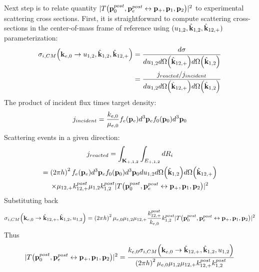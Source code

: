 \documentclass{article}[draft]
\begin{document}
Next step is to relate quantity $| T\of{\vect{p}_0^{post}, \vect{p}_e^{post} \leftrightarrow \vect{p}_+, \vect{p}_1, \vect{p}_2} |^2$ to experimental scattering cross sections. First, it is straightforward to compute scattering cross-sections in the center-of-mass frame of reference using $(u_{1,2}, \hat{\mathbf{k}}_{1,2}, \hat{\mathbf{k}}_{12,+})$ parameterization:
\begin{align*}
\sigma_{i,CM} \of{ \vect{k}_{e,0} \rightarrow u_{1,2}, \hat{\vect{k}}_{1,2}, \hat{\vect{k}}_{12,+}} 
&= \frac{d\sigma}{d u_{1,2} d\Omega\of{\hat{\vect{k}}_{12,+}} d\Omega\of{\hat{\vect{k}}_{1,2}}}
\\
&= \frac{j_{reacted}/j_{incident}}{d u_{1,2} d\Omega\of{\hat{\vect{k}}_{12,+}} d\Omega\of{\hat{\vect{k}}_{1,2}}}
\end{align*}
The product of incident flux times target density:
\begin{align*}
j_{incident} = \frac{k_{e,0}}{\mu_{e,0}} f_e\of{\vect{p}_e} d^3 \vect{p}_e f_0\of{\vect{p}_0} d^3 \vect{p}_0
\end{align*}
Scattering events in a given direction:
\begin{multline*}
j_{reacted} = \int_{\vect{K}_{+,1,2}} \int_{E_{+,1,2}} d R_i
\\
= \left( 2 \pi \planck \right)^2 
f_e\of{\vect{p}_e} d^3 \vect{p}_e f_0\of{\vect{p}_0} d^3 \vect{p}_0 
d u_{1,2} 
d\Omega\of{\hat{\vect{k}}_{1,2}}
d\Omega\of{\hat{\vect{k}}_{12,+}} 
\\
\times
\mu_{12,+} k^{post}_{12,+}
\mu_{1,2} k^{post}_{1,2}  
| T\of{\vect{p}_0^{post}, \vect{p}_e^{post} \leftrightarrow \vect{p}_+, \vect{p}_1, \vect{p}_2} |^2
\end{multline*}
Substituting back
\begin{align*}
\sigma_{i,CM}\of{\vect{k}_{e,0} \rightarrow \hat{\vect{k}}_{12,+}, \hat{\vect{k}}_{1,2}, u_{1,2}} 
=
\left( 2 \pi \planck \right)^2 
\mu_{e,0} \mu_{1,2} \mu_{12,+} \frac{k^{post}_{12,+}}{k_{e,0}} k^{post}_{1,2}
| T\of{\vect{p}_0^{post}, \vect{p}_e^{post} \leftrightarrow \vect{p}_+, \vect{p}_1, \vect{p}_2} |^2
\end{align*}
Thus
\begin{align*}
| T\of{\vect{p}_0^{post}, \vect{p}_e^{post} \leftrightarrow \vect{p}_+, \vect{p}_1, \vect{p}_2} |^2
= \frac{ k_{e,0} \sigma_{i,CM}\of{\vect{k}_{e,0} \rightarrow \hat{\vect{k}}_{12,+}, \hat{\vect{k}}_{1,2}, u_{1,2}} }
{ \left( 2 \pi \planck \right)^2 
\mu_{e,0} \mu_{1,2} \mu_{12,+} k^{post}_{12,+} k^{post}_{1,2} }
\end{align*}
\end{document}
